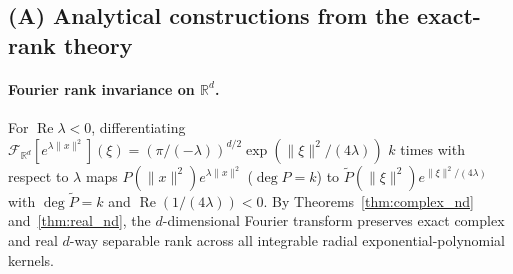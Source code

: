 \documentclass[11pt,a4paper]{article}
\theoremstyle{plain}
\theoremstyle{definition}
\newcommand{\R}{\mathbb{R}}
\DeclareMathOperator{\RePart}{Re}
\begin{document}
\subsection{(A) Analytical constructions from the exact-rank theory}\label{sec:steerable}

\paragraph{Fourier rank invariance on $\R^d$.}
For $\RePart\lambda < 0$, differentiating $\mathcal{F}_{\R^d}[e^{\lambda\|x\|^2}](\xi) =\allowbreak (\pi/(-\lambda))^{d/2}\allowbreak \exp(\|\xi\|^2/(4\lambda))$ $k$ times with respect to $\lambda$ maps $P(\|x\|^2)e^{\lambda\|x\|^2}$ ($\deg P = k$) to $\widetilde{P}(\|\xi\|^2)e^{\|\xi\|^2/(4\lambda)}$ with $\deg\widetilde{P} = k$ and $\RePart(1/(4\lambda)) < 0$. By Theorems~\ref{thm:complex_nd} and~\ref{thm:real_nd}, the $d$-dimensional Fourier transform preserves exact complex and real $d$-way separable rank across all integrable radial exponential-polynomial kernels.
\end{document}
